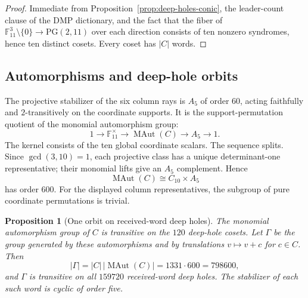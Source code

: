 \documentclass[11pt]{article}
\newtheorem{proposition}[theorem]{Proposition}
\theoremstyle{definition}
\theoremstyle{remark}
\newcommand{\PG}{\mathrm{PG}}
\newcommand{\F}{\mathbb{F}}
\begin{document}
\begin{proof}
Immediate from Proposition~\ref{prop:deep-holes-conic}, the leader-count
clause of the DMP dictionary, and the fact that the fiber of
$\F_{11}^3\setminus\{0\}\to\PG(2,11)$ over each direction consists of ten
nonzero syndromes, hence ten distinct cosets. Every coset has $|C|$ words.
\end{proof}

\subsection{Automorphisms and deep-hole orbits}
\label{sec:automorphisms}

The projective stabilizer of the six column rays is $A_5$ of order $60$,
acting faithfully and $2$-transitively on the coordinate supports. It is
the support-permutation quotient of the monomial automorphism group:
\[
 1\longrightarrow\F_{11}^{\times}\longrightarrow
 \operatorname{MAut}(C)\longrightarrow A_5\longrightarrow1.
\]
The kernel consists of the ten global coordinate scalars. The sequence
splits. Since $\gcd(3,10)=1$, each projective class has a unique
determinant-one representative; their monomial lifts give an $A_5$
complement. Hence
\[
 \operatorname{MAut}(C)\cong C_{10}\times A_5
\]
has order $600$. For the displayed column representatives, the subgroup of
pure coordinate permutations is trivial.

\begin{proposition}[One orbit on received-word deep holes]
\label{prop:deep-hole-orbit}
The monomial automorphism group of $C$ is transitive on the $120$ deep-hole
cosets. Let $\Gamma$ be the group generated by these automorphisms and by
translations $v\mapsto v+c$ for $c\in C$. Then
\[
 |\Gamma|=|C|\,|\operatorname{MAut}(C)|=1331\cdot600=798600,
\]
and $\Gamma$ is transitive on all $159720$ received-word deep holes. The
stabilizer of each such word is cyclic of order five.
\end{proposition}
\end{document}
